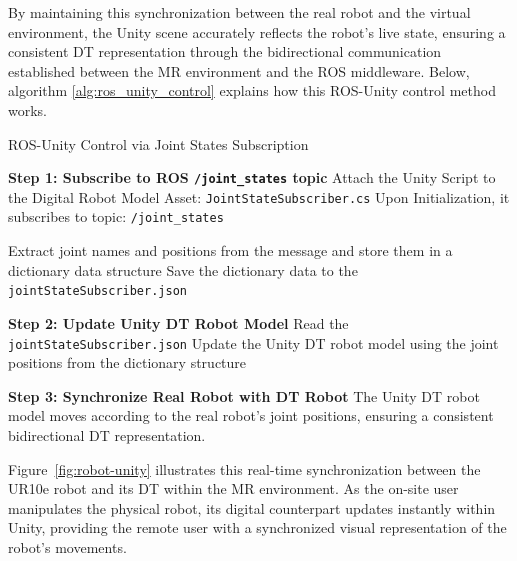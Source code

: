 By maintaining this synchronization between the real robot and the virtual environment, the Unity scene accurately reflects the robot's live state, ensuring a consistent \ac{DT} representation through the bidirectional communication established between the \ac{MR} environment and the \ac{ROS} middleware. Below, algorithm \ref{alg:ros_unity_control} explains how this \ac{ROS}-Unity control method works.


\begin{algorithm}
    \caption{ROS-Unity Control via Joint States Subscription}\label{alg:ros_unity_control}
    \begin{algorithmic}[1]
        \State \textbf{Step 1: Subscribe to ROS \texttt{/joint\_states} topic}
        \State Attach the Unity Script to the Digital Robot Model Asset: \texttt{JointStateSubscriber.cs}
        \State Upon Initialization, it subscribes to topic: \texttt{/joint\_states}

            \State Extract joint names and positions from the message and store them in a dictionary data structure
            \State Save the dictionary data to the \texttt{jointStateSubscriber.json}
        \EndWhile

        \State \textbf{Step 2: Update Unity \ac{DT} Robot Model}
            \State Read the \texttt{jointStateSubscriber.json}
            \State Update the Unity \ac{DT} robot model using the joint positions from the dictionary structure
        \EndWhile

        \State \textbf{Step 3: Synchronize Real Robot with \ac{DT} Robot}
        \State The Unity \ac{DT} robot model moves according to the real robot’s joint positions, ensuring a consistent bidirectional \ac{DT} representation.
    \end{algorithmic}
\end{algorithm}

Figure~\ref{fig:robot-unity} illustrates this real-time synchronization between the UR10e robot and its \ac{DT} within the \ac{MR} environment. As the on-site user manipulates the physical robot, its digital counterpart updates instantly within Unity, providing the remote user with a synchronized visual representation of the robot’s movements.

